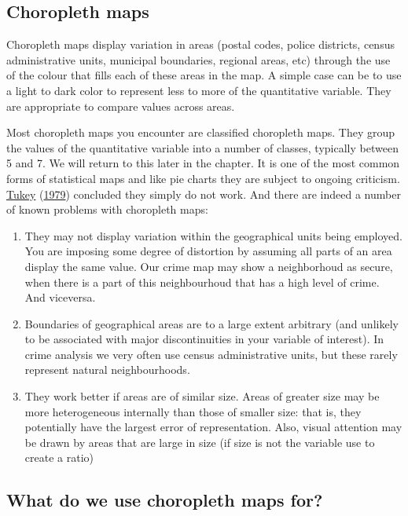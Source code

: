 \documentclass[
  krantz2]{krantz}
\begin{document}
\hypertarget{choropleth-maps}{%
\subsection{Choropleth maps}\label{choropleth-maps}}

Choropleth maps display variation in areas (postal codes, police districts, census administrative units, municipal boundaries, regional areas, etc) through the use of the colour that fills each of these areas in the map. A simple case can be to use a light to dark color to represent less to more of the quantitative variable. They are appropriate to compare values across areas.

Most choropleth maps you encounter are classified choropleth maps. They group the values of the quantitative variable into a number of classes, typically between 5 and 7. We will return to this later in the chapter. It is one of the most common forms of statistical maps and like pie charts they are subject to ongoing criticism. \protect\hyperlink{ref-Tukey_1979}{Tukey} (\protect\hyperlink{ref-Tukey_1979}{1979}) concluded they simply do not work. And there are indeed a number of known problems with choropleth maps:

\begin{enumerate}
\def\labelenumi{\arabic{enumi}.}
\item
  They may not display variation within the geographical units being employed. You are imposing some degree of distortion by assuming all parts of an area display the same value. Our crime map may show a neighborhoud as secure, when there is a part of this neighbourhoud that has a high level of crime. And viceversa.
\item
  Boundaries of geographical areas are to a large extent arbitrary (and unlikely to be associated with major discontinuities in your variable of interest). In crime analysis we very often use census administrative units, but these rarely represent natural neighbourhoods.
\item
  They work better if areas are of similar size. Areas of greater size may be more heterogeneous internally than those of smaller size: that is, they potentially have the largest error of representation. Also, visual attention may be drawn by areas that are large in size (if size is not the variable use to create a ratio)
\end{enumerate}

\hypertarget{what-do-we-use-choropleth-maps-for}{%
\subsection{What do we use choropleth maps for?}\label{what-do-we-use-choropleth-maps-for}}
\end{document}
